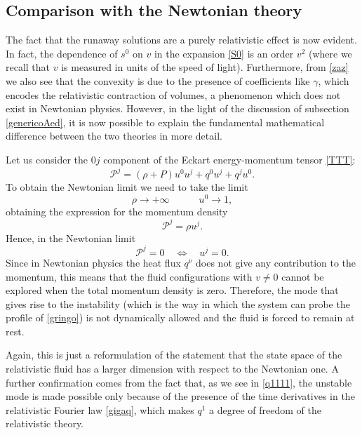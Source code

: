 \documentclass[a4paper, amsfonts, amssymb, amsmath, reprint, showkeys, nofootinbib, twoside]{revtex4-1}
\newcommand{\spc}{\quad \quad \quad}
\begin{document}
\subsection{Comparison with the Newtonian theory}

The fact that the runaway solutions are a purely relativistic effect is now evident. In fact, the dependence of $s^0$ on $v$ in the expansion \eqref{S0} is an order $v^2$ (where we recall that $v$ is measured in units of the speed of light). Furthermore, from \eqref{zaz} we also see that the convexity is due to the presence of coefficients like $\gamma$, which encodes the relativistic contraction of volumes, a phenomenon which does not exist in Newtonian physics. However, in the light of the discussion of subsection \ref{genericoAed}, it is  now possible to explain the fundamental mathematical difference between the two theories in more detail.

Let us consider the $0j$ component of the Eckart energy-momentum tensor \eqref{TTT}:
\begin{equation}
\mathcal{P}^j = (\rho +P)u^0 u^j+ q^0 u^j + q^j u^0.
\end{equation}
To obtain the Newtonian limit we need to take the limit
\begin{equation}
\rho \longrightarrow +\infty  \spc  u^0 \longrightarrow 1,
\end{equation}
obtaining the expression for the momentum density
\begin{equation}\label{PJJJ}
\mathcal{P}^j = \rho u^j.
\end{equation}
Hence, in the Newtonian limit 
\begin{equation}
\mathcal{P}^j =0  \quad \Longleftrightarrow \quad u^j=0.
\end{equation}
Since in  Newtonian physics the heat flux $q^\nu$ does not give any contribution to the momentum, this means that  the fluid configurations with $v\neq 0$ cannot be explored when the total momentum density is zero.  
Therefore, the mode that gives rise to the instability (which is the way in which the system can probe the profile of \eqref{gringo}) is not dynamically allowed and the fluid is forced to remain at rest. 

Again, this is just a reformulation of the statement that the state space of the relativistic fluid has a larger dimension with respect to the Newtonian one. A further confirmation comes from the fact that, as we see in \eqref{q1111}, the unstable mode is made possible only because of the presence of the time derivatives in the relativistic Fourier law \eqref{gigaq}, which makes $q^1$ a degree of freedom of the relativistic theory. 
\end{document}
